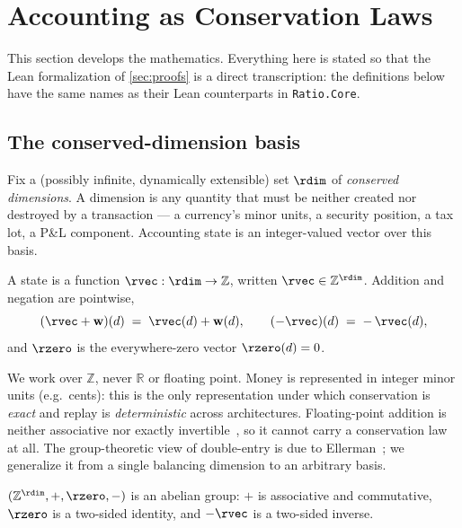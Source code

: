 \section{Accounting as Conservation Laws}
\label{sec:conservation}

This section develops the mathematics. Everything here is stated so that
the Lean formalization of \cref{sec:proofs} is a direct transcription:
the definitions below have the same names as their Lean counterparts in
\texttt{Ratio.Core}.

\subsection{The conserved-dimension basis}

Fix a (possibly infinite, dynamically extensible) set $\rdim$ of
\emph{conserved dimensions}. A dimension is any quantity that must be
neither created nor destroyed by a transaction --- a currency's minor
units, a security position, a tax lot, a P\&L component. Accounting
state is an integer-valued vector over this basis.

\begin{definition}
\label{def:vec}
A state is a function $\rvec : \rdim \to \mathbb{Z}$, written
$\rvec \in \mathbb{Z}^{\rdim}$. Addition and negation are pointwise,
\[
  (\rvec + \mathbf{w})(d) \;=\; \rvec(d) + \mathbf{w}(d),
  \qquad
  (-\rvec)(d) \;=\; -\,\rvec(d),
\]
and $\rzero$ is the everywhere-zero vector $\rzero(d) = 0$.
\end{definition}

We work over $\mathbb{Z}$, never $\mathbb{R}$ or floating point. Money is
represented in integer minor units (e.g.\ cents): this is the only
representation under which conservation is \emph{exact} and replay is
\emph{deterministic} across architectures. Floating-point addition is
neither associative nor exactly invertible~\cite{goldberg1991floating},
so it cannot carry a conservation law at all. The group-theoretic view of
double-entry is due to Ellerman~\cite{ellerman1985mathematics}; we
generalize it from a single balancing dimension to an arbitrary basis.

\begin{proposition}
\label{prop:group}
$(\mathbb{Z}^{\rdim}, +, \rzero, -)$ is an abelian group: $+$ is
associative and commutative, $\rzero$ is a two-sided identity, and $-\rvec$
is a two-sided inverse.
\end{proposition}

